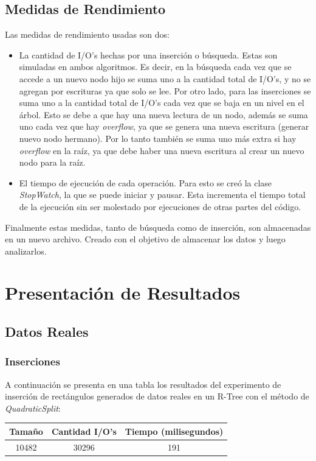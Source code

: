 \documentclass[letterpaper,12pt]{article}
\begin{document}
\subsection{Medidas de Rendimiento}
Las medidas de rendimiento usadas son dos:
\begin{itemize}
\item La cantidad de I/O's hechas por una inserci\'on o b\'usqueda. Estas son simuladas en ambos algoritmos. Es decir, en la b\'usqueda cada vez que se accede a un nuevo nodo hijo se suma uno a la cantidad total de I/O's, y no se agregan por escrituras ya que solo se lee. Por otro lado, para las inserciones se suma uno a la cantidad total de I/O's cada vez que se baja en un nivel en el \'arbol. Esto se debe a que hay una nueva lectura de un nodo, adem\'as se suma uno cada vez que hay \textit{overflow}, ya que se genera una nueva escritura (generar nuevo nodo hermano). Por lo tanto tambi\'en se suma uno m\'as extra si hay \textit{overflow} en la ra\'iz, ya que debe haber una nueva escritura al crear un nuevo nodo para la ra\'iz.
	
\item El tiempo de ejecuci\'on de cada operaci\'on. Para esto se cre\'o la clase \textit{StopWatch}, la que se puede iniciar y pausar. Esta incrementa el tiempo total de la ejecución sin ser molestado por ejecuciones de otras partes del c\'odigo.
\end{itemize}
Finalmente estas medidas, tanto de b\'usqueda como de inserci\'on, son almacenadas en un nuevo archivo. Creado con el objetivo de almacenar los datos y luego analizarlos.

\newpage
\section{Presentaci\'on de Resultados}

\subsection{Datos Reales}

\subsubsection{Inserciones}
A continuaci\'on se presenta en una tabla los resultados del experimento de inserci\'on de rect\'angulos generados de datos reales en un R-Tree con el m\'etodo de \textit{QuadraticSplit}: \\
\begin{tabular}{|c|c|c|}
\hline
\textbf{Tama\~no} & \textbf{Cantidad I/O's} & \textbf{Tiempo (milisegundos)} \\
\hline
10482 & 30296 & 191 \\
\hline
\end{tabular}
\\ \\
\end{document}
